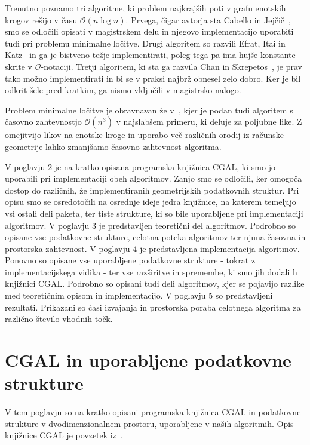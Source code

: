 \documentclass[a4paper, 12pt]{book}
\newcommand{\OO}{\ensuremath{\mathcal{O}}} %
\newcommand{\clearemptydoublepage}{\newpage{\pagestyle{empty}\cleardoublepage}}
\begin{document}
Trenutno poznamo tri algoritme, ki problem najkrajših poti v grafu enotskih krogov rešijo v času $\OO(n\log n)$. Prvega, čigar avtorja sta Cabello in Jejčič~\cite{CJ15}, smo se odločili opisati v magistrskem delu in njegovo implementacijo uporabiti tudi pri problemu minimalne ločitve.
Drugi algoritem so razvili Efrat, Itai in Katz~\cite{eik-01} in ga je bistveno težje implementirati, poleg tega pa ima hujše konstante skrite v \OO -notaciji.
Tretji algoritem, ki sta ga razvila Chan in Skrepetos~\cite{ChanS16}, je prav tako možno implementirati in bi se v praksi najbrž obnesel zelo dobro. Ker je bil odkrit šele pred kratkim, ga nismo vključili v magistrsko nalogo.

Problem minimalne ločitve je obravnavan že v~\cite{CG16}, kjer je podan tudi algoritem s časovno zahtevnostjo $\OO(n^3)$ v najslabšem primeru, ki deluje za poljubne like. Z omejitvijo likov na enotske kroge in uporabo več različnih orodij iz računske geometrije lahko zmanjšamo časovno zahtevnost algoritma.

V poglavju 2 je na kratko opisana programska knjižnica CGAL, ki smo jo uporabili pri implementaciji obeh algoritmov. Zanjo smo se odločili, ker omogoča dostop do različnih, že implementiranih geometrijskih podatkovnih struktur. Pri opisu smo se osredotočili na osrednje ideje jedra knjižnice, na katerem temeljijo vsi ostali deli paketa, ter tiste strukture, ki so bile uporabljene pri implementaciji algoritmov. V poglavju 3 je predstavljen teoretični del algoritmov. Podrobno so opisane vse podatkovne strukture, celotna poteka algoritmov ter njuna časovna in prostorska zahtevnost. V poglavju 4 je predstavljena implementacija algoritmov. Ponovno so opisane vse uporabljene podatkovne strukture - tokrat z implementacijskega vidika - ter vse razširitve in spremembe, ki smo jih dodali h knjižnici CGAL. Podrobno so opisani tudi deli algoritmov, kjer se pojavijo razlike med teoretičnim opisom in implementacijo. V poglavju 5 so predstavljeni rezultati. Prikazani so časi izvajanja in prostorska poraba celotnega algoritma za različno število vhodnih točk.

\clearemptydoublepage


\chapter{CGAL in uporabljene podatkovne strukture}
\label{ch1}

V tem poglavju so na kratko opisani programska knjižnica CGAL in podatkovne strukture v dvodimenzionalnem prostoru, uporabljene v naših algoritmih. Opis knjižnice CGAL je povzetek iz~\cite{cgal:bfghhkps-lgk23-16b}.
\end{document}
